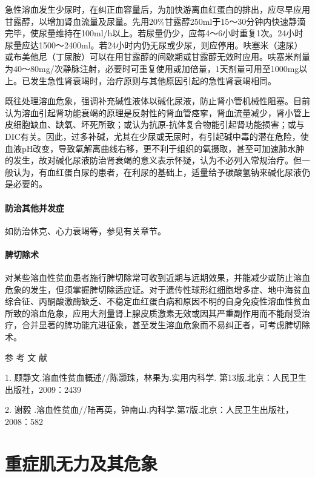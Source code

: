 急性溶血发生少尿时，在纠正血容量后，为加快游离血红蛋白的排出，应尽早应用甘露醇，以增加肾血流量及尿量。先用20\%甘露醇250ml于15～30分钟内快速静滴完毕，使尿量维持在100ml/h以上。若尿量仍少，应每4～6小时重复1次。24小时尿量应达1500～2400ml。若24小时内仍无尿或少尿，则应停用。呋塞米（速尿）或布美他尼（丁尿胺）可以在用甘露醇的间歇期或甘露醇无效时应用。呋塞米剂量为40～80mg/次静脉注射，必要时可重复使用或加倍量，1天剂量可用至1000mg以上。已发生急性肾衰竭时，治疗原则与其他原因引起的急性肾衰竭相同。

既往处理溶血危象，强调补充碱性液体以碱化尿液，防止肾小管机械性阻塞。目前认为溶血引起肾功能衰竭的原理是反射性的肾血管痉挛，肾血流量减少，肾小管上皮细胞缺血、缺氧、坏死所致；或认为抗原-抗体复合物能引起肾功能损害；或与DIC有关。因此，过多补碱，尤其在少尿或无尿时，有引起碱中毒的潜在危险，使血液pH改变，导致氧解离曲线右移，更不利于组织的氧摄取，甚至可加速肺水肿的发生，故对碱化尿液防治肾衰竭的意义表示怀疑，认为不必列入常规治疗。但一般认为，有血红蛋白尿的患者，在利尿的基础上，适量给予碳酸氢钠来碱化尿液仍是必要的。

\subsubsection{防治其他并发症}

如防治休克、心力衰竭等，参见有关章节。

\subsubsection{脾切除术}

对某些溶血性贫血患者施行脾切除常可收到近期与远期效果，并能减少或防止溶血危象的发生，但须掌握脾切除适应证。对于遗传性球形红细胞增多症、地中海贫血综合征、丙酮酸激酶缺乏、不稳定血红蛋白病和原因不明的自身免疫性溶血性贫血所致的溶血危象，应用大剂量肾上腺皮质激素无效或因其严重副作用而不能耐受治疗，合并显著的脾功能亢进征象，甚至发生溶血危象而不易纠正者，可考虑脾切除术。
\protect\hypertarget{text00127.html}{}{}

\hypertarget{text00127.htmlux5cux23CHP4-16-4}{}
参 考 文 献

1. 顾静文.溶血性贫血概述//陈灏珠，林果为.实用内科学.
第13版.北京：人民卫生出版社，2009：2439

2. 谢毅
.溶血性贫血//陆再英，钟南山.内科学.第7版.北京：人民卫生出版社，2008：582

\protect\hypertarget{text00128.html}{}{}

\chapter{重症肌无力及其危象}

